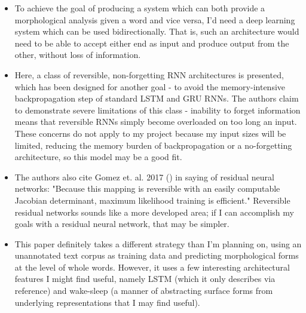 \documentclass[12pt]{report}
\begin{document}
\begin{itemize}

	\item To achieve the goal of producing a system which can both provide a morphological analysis given a word and vice versa, I'd need a deep learning system which can be used bidirectionally. That is, such an architecture would need to be able to accept either end as input and produce output from the other, without loss of information. 
	
	\item Here, a class of reversible, non-forgetting RNN architectures is presented, which has been designed for another goal - to avoid the memory-intensive backpropagation step of standard LSTM and GRU RNNs. The authors claim to demonstrate severe limitations of this class - inability to forget information means that reversible RNNs simply become overloaded on too long an input. These concerns do not apply to my project because my input sizes will be limited, reducing the memory burden of backpropagation or a no-forgetting architecture, so this model may be a good fit.
	
	\item The authors also cite Gomez et. al. 2017 (\cite{Gomez2017}) in saying of residual neural networks: "Because this mapping is reversible with an easily computable Jacobian determinant, maximum likelihood training is efficient." Reversible residual networks sounds like a more developed area; if I can accomplish my goals with a residual neural network, that may be simpler.

\end{itemize}


\begin{itemize}
	
	\item This paper definitely takes a different strategy than I'm planning on, using an unannotated text corpus as training data and predicting morphological forms at the level of whole words. However, it uses a few interesting architectural features I might find useful, namely LSTM (which it only describes via reference) and wake-sleep (a manner of abstracting surface forms from underlying representations that I may find useful).
	
\end{itemize}



\end{document}
